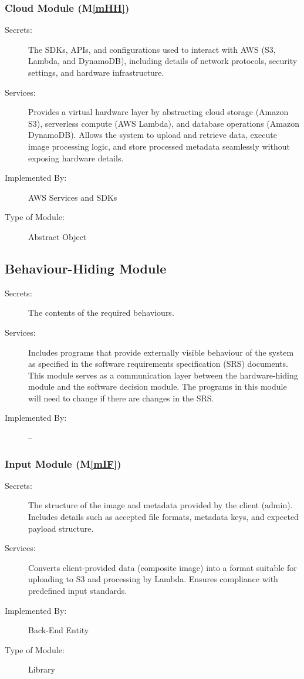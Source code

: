 \documentclass[12pt, titlepage]{article}
\newcommand{\mref}[1]{M\ref{#1}}
\begin{document}
\subsubsection{Cloud Module (\mref{mHH})}

\begin{description}
\item[Secrets:]The SDKs, APIs, and configurations used to interact with AWS (S3, Lambda, and DynamoDB), including details of network protocols, security settings, and hardware infrastructure.
\item[Services:]Provides a virtual hardware layer by abstracting cloud storage (Amazon S3), serverless compute (AWS Lambda), and database operations (Amazon DynamoDB). Allows the system to upload and retrieve data, execute image processing logic, and store processed metadata seamlessly without exposing hardware details.
\item[Implemented By:] AWS Services and SDKs
\item[Type of Module:] Abstract Object
\end{description}

\subsection{Behaviour-Hiding Module}

\begin{description}
\item[Secrets:]The contents of the required behaviours.
\item[Services:]Includes programs that provide externally visible behaviour of
  the system as specified in the software requirements specification (SRS)
  documents. This module serves as a communication layer between the
  hardware-hiding module and the software decision module. The programs in this
  module will need to change if there are changes in the SRS.
\item[Implemented By:] --
\end{description}

\subsubsection{Input Module (\mref{mIF})}

\begin{description}
\item[Secrets:]The structure of the image and metadata provided by the client (admin). Includes details such as accepted file formats, metadata keys, and expected payload structure.
\item[Services:]Converts client-provided data (composite image) into a format suitable for uploading to S3 and processing by Lambda. Ensures compliance with predefined input standards.
\item[Implemented By:] Back-End Entity
\item[Type of Module:] Library
\end{description}
\end{document}
